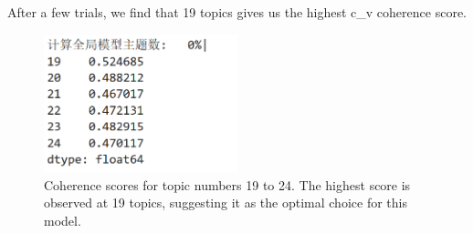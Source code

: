 \documentclass[12pt]{article}
\begin{document}
	After a few trials, we find that 19 topics gives us the highest c\_v coherence score. 
	\begin{figure}[H]
		\centering
		\includegraphics[width=0.5\textwidth]{Q2CV1} 
		\caption{\centering Coherence scores for topic numbers 19 to 24. The highest score is observed at 19 topics, suggesting it as the optimal choice for this model.}		
	\end{figure}
	
\end{document}
